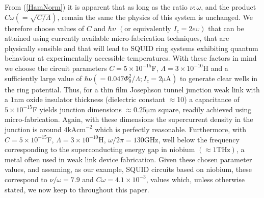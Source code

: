 \documentclass[twocolumn,a4paper,superscriptaddress,showpacs,floatfix,pra]{revtex4}
\begin{document}
From (\ref{HamNorm})  it is  apparent that as  long as the  ratio $\nu
:\omega $,  and the product $C\omega  \left( =\sqrt{C/\Lambda }\right)
$,  remain  the same  the  physics of  this  system  is unchanged.  We
therefore choose values of $C$  and $\hbar \upsilon $ $\left( \text{or
equivalently }I_{c}=2e\upsilon  \right) $  that can be  attained using
currently available micro-fabrication  techniques, that are physically
sensible and that  will lead to SQUID ring  systems exhibiting quantum
behaviour  at  experimentally   accessible  temperatures.  With  these
factors  in   mind  we   choose  the  circuit   parameters  $C=5\times
10^{-15}$\textrm{F},  $\Lambda   =3\times  10^{-10}$\textrm{H}  and  a
sufficiently   large   value   of   $\hbar   \nu   \left(   =0.047\Phi
_{0}^{2}/\Lambda ;  I_c = 2\mathrm{\mu  A}\right) $ to  generate clear
wells in  the ring potential. Thus,  for a thin  film Josephson tunnel
junction weak link with  a $1$nm oxide insulator thickness (dielectric
constant  $\approx $10)  a capacitance  of $5\times  10^{-15}$F yields
junction  dimensions  $\approx  0.25\mathrm{\mu  m}$  square,  readily
achieved  using micro-fabrication.  Again, with  these  dimensions the
supercurrent density  in the junction  is around $4\mathrm{kAcm}^{-2}$
which   is   perfectly   reasonable.  Furthermore,   with   $C=5\times
10^{-15}$\textrm{F},  $\Lambda =3\times 10^{-10}  $\textrm{H}, $\omega
/2\pi =130\mathrm{GHz}$, well below the frequency corresponding to the
superconducting    energy    gap    in   niobium    $\left(    \approx
1\mathrm{THz}\right)$,  a  metal  often   used  in  weak  link  device
fabrication. Given these chosen parameter values, and assuming, as our
example,  SQUID circuits based  on niobium,  these correspond  to $\nu
/\omega =7.9$  and $C\omega =4.1\times 10^{-3}$,  values which, unless
otherwise stated, we now keep to throughout this paper.
\end{document}
